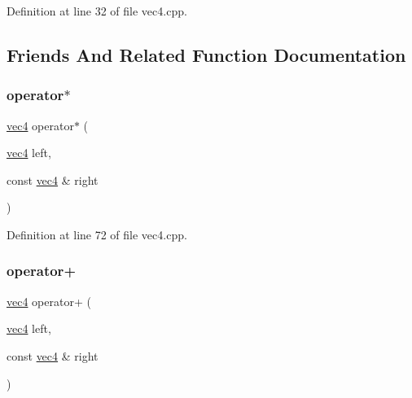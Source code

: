 Definition at line 32 of file vec4.\+cpp.



\subsection{Friends And Related Function Documentation}
\mbox{\label{structspork_1_1maths_1_1vec4_a37d87fd93437b19bb5227e993e55e01f}} 
\subsubsection{\texorpdfstring{operator$\ast$}{operator*}}
{\footnotesize\ttfamily \hyperlink{structspork_1_1maths_1_1vec4}{vec4} operator$\ast$ (\begin{DoxyParamCaption}\item[{\hyperlink{structspork_1_1maths_1_1vec4}{vec4}}]{left,  }\item[{const \hyperlink{structspork_1_1maths_1_1vec4}{vec4} \&}]{right }\end{DoxyParamCaption})\hspace{0.3cm}{\ttfamily [friend]}}



Definition at line 72 of file vec4.\+cpp.

\mbox{\label{structspork_1_1maths_1_1vec4_a9ec62ee0886928c55c9b6f0288c73c60}} 
\subsubsection{\texorpdfstring{operator+}{operator+}}
{\footnotesize\ttfamily \hyperlink{structspork_1_1maths_1_1vec4}{vec4} operator+ (\begin{DoxyParamCaption}\item[{\hyperlink{structspork_1_1maths_1_1vec4}{vec4}}]{left,  }\item[{const \hyperlink{structspork_1_1maths_1_1vec4}{vec4} \&}]{right }\end{DoxyParamCaption})\hspace{0.3cm}{\ttfamily [friend]}}



